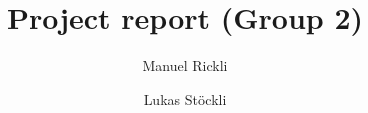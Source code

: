 
\title{Project report (Group 2)}
\author{Manuel Rickli \and Lukas Stöckli}

\maketitle







%

%
%
